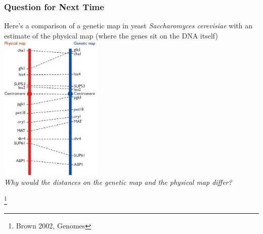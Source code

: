 \documentclass{beamer}
\newcommand\blfootnote[1]{%
	\begingroup
	\renewcommand\thefootnote{}\footnote{#1}%
	\addtocounter{footnote}{-1}%
	\endgroup
}
\begin{document}
	
	
	
	\begin{frame}
		
		\frametitle{Question for Next Time}

		Here's a comparison of a genetic map in yeast \textit{Saccharomyces cerevisiae} with an estimate of the physical map (where the genes sit on the DNA itself)\\
		
		\centering	\includegraphics[keepaspectratio, width  =0.37\textwidth]{img/physical_v_genetic} \\
		
		
\textit{		Why would the distances on the genetic map and the physical map differ?}

\blfootnote{Brown 2002, Genomes}
	\end{frame}
	
	
\end{document}

